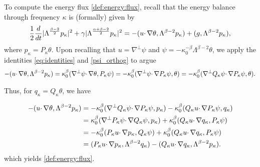 \documentclass[twoside, reqno]{amsart}
\numberwithin{lemma}{section}
\numberwithin{theorem}{section}
\numberwithin{proposition}{section}
\numberwithin{equation}{section} %
\newcommand{\ka}{\kappa}
\newcommand{\al}{\alpha}
\newcommand{\be}{\beta}
\newcommand{\gam}{\gamma}
\newcommand{\kap}{\kappa}
\newcommand{\Lam}{\Lambda}
\newcommand{\tht}{\theta}
\begin{document}
To compute the energy flux \eqref{def:energy:flux}, recall that the energy balance through frequency $\kap$ is (formally) given by
    \begin{align}\notag
        \frac{1}2\frac{d}{dt}|\Lam^{\frac{\be-2}{2}}p_\kap|^2+\gam|\Lam^{\frac{\al+\be-2}{2}}p_\kap|^2=-(u\cdotp\nabla \tht,\Lam^{\be-2}p_\kap)+(g,\Lam^{\be-2}p_\kap),
    \end{align}
where $p_\kap=P_\kap \tht$. Upon recalling that $u=\nabla^\perp\psi$ and %
$\psi=-\ka_0^{-\beta}\Lam^{\be-2}\tht$,
we apply the identities \eqref{eq:identities} and \eqref{psi_orthog} to argue
    \begin{align}
    -(u\cdotp\nabla \tht,\Lam^{\be-2}p_\kap)=\ka_0^\be(\nabla^\perp\psi\cdotp\nabla \tht,P_\kap\psi)=-\ka_0^\be(\nabla^\perp\psi\cdotp\nabla P_\kap\psi,\tht)=-\ka_0^\be(\nabla^\perp Q_\kap\psi\cdotp\nabla P_\kap\psi,\tht)\notag.
    \end{align}
    
Thus, for $q_\kap=Q_\kap\tht$, we have

   \begin{align}
     -(u\cdotp\nabla \tht,\Lam^{\be-2}p_\kap)&=-\ka_0^\be(\nabla^\perp Q_\kap\psi \cdotp\nabla P_\kap\psi,p_\kap)-\ka_0^\be(Q_\kap u\cdotp\nabla P_\kap\psi, q_\kap)\notag
     \\
     &= \ka_0^\be(\nabla^\perp P_\kap\psi \cdotp\nabla Q_\kap\psi,p_\kap)+\ka_0^\be(Q_\kap u\cdotp\nabla  q_\kap, P_\kap\psi)\notag
     \\
     &=-\ka_0^\be(P_\kap u \cdotp\nabla p_\kap,Q_\kap\psi)+\ka_0^\be(Q_\kap u\cdotp\nabla  q_\kap, P_\kap\psi)\notag
     \\
     &=(P_\kap u \cdotp\nabla p_\kap,\Lam^{\be-2}q_\kap)-(Q_\kap u\cdotp\nabla  q_\kap, \Lam^{\be-2}p_\kap)\notag.
    \end{align}
    which yields \eqref{def:energy:flux}.
\end{document}
